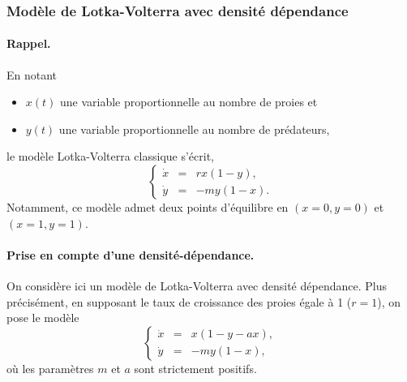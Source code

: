 \subsubsection{Modèle de Lotka-Volterra avec densité dépendance} 

\paragraph{Rappel.}
En notant 
\begin{itemize}
  \item $x(t)$ une variable proportionnelle au nombre de proies et
  \item $y(t)$ une variable proportionnelle au nombre de prédateurs,
\end{itemize}
le modèle Lotka-Volterra classique s'écrit, 
\begin{equation} \label{eq:LV}
\left\{\begin{array}{rcr}
        \dot x & = & r x (1 - y), \\ 
        \dot y & = & - m y (1 - x).
        \end{array}\right.
\end{equation}
Notamment, ce modèle admet deux points d'équilibre en $(x=0, y=0)$ et $(x=1, y=1)$.

\paragraph{Prise en compte d'une densité-dépendance.}
On considère ici un modèle de Lotka-Volterra avec densité dépendance. Plus précisément, en supposant le taux de croissance des proies égale à 1 ($r = 1$), on pose le modèle
\begin{equation} \label{eq:LVDD}
\left\{\begin{array}{rcr}
        \dot x & = & x (1 - y - ax), \\ 
        \dot y & = & - m y (1 - x), 
        \end{array}\right.
\end{equation}
où les paramètres $m$ et $a$ sont strictement positifs. 

